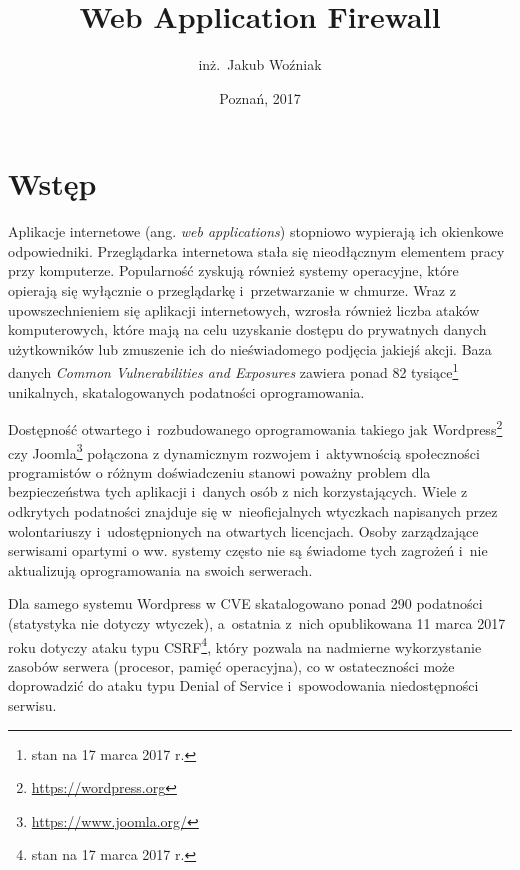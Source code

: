 \documentclass[11pt,a4paper,polish,thesis]{dcsbook}
\begin{document}
\author{inż.~Jakub Woźniak}
\title{Web Application Firewall}
\date{Poznań, 2017}
\maketitle
\frontmatter
\tableofcontents
\mainmatter


\chapter{Wstęp}

Aplikacje internetowe (ang. \textit{web applications}) stopniowo wypierają ich okienkowe odpowiedniki. Przeglądarka internetowa stała się nieodłącznym elementem pracy przy komputerze. Popularność zyskują również systemy operacyjne, które opierają się wyłącznie o przeglądarkę i~przetwarzanie w chmurze. Wraz z upowszechnieniem się aplikacji internetowych, wzrosła również liczba ataków komputerowych, które mają na celu uzyskanie dostępu do prywatnych danych użytkowników lub zmuszenie ich do nieświadomego podjęcia jakiejś akcji. Baza danych \textit{Common Vulnerabilities and Exposures}\cite{cve} zawiera ponad 82 tysiące\footnote{stan na 17 marca 2017 r.} unikalnych, skatalogowanych podatności oprogramowania.

Dostępność otwartego i~rozbudowanego oprogramowania takiego jak Wordpress\footnote{\url{https://wordpress.org}} czy Joomla\footnote{\url{https://www.joomla.org/}} połączona z dynamicznym rozwojem i~aktywnością społeczności programistów o różnym doświadczeniu stanowi poważny problem dla bezpieczeństwa tych aplikacji i~danych osób z nich korzystających. Wiele z odkrytych podatności znajduje się w~nieoficjalnych wtyczkach napisanych przez wolontariuszy i~udostępnionych na otwartych licencjach. Osoby zarządzające serwisami opartymi o ww. systemy często nie są świadome tych zagrożeń i~nie aktualizują oprogramowania na swoich serwerach. 

Dla samego systemu Wordpress w CVE skatalogowano ponad 290 podatności (statystyka nie dotyczy wtyczek), a~ostatnia z~nich opublikowana 11 marca 2017 roku dotyczy ataku typu CSRF\footnote{stan na 17 marca 2017 r.}, który pozwala na nadmierne wykorzystanie zasobów serwera (procesor, pamięć operacyjna), co w ostateczności może doprowadzić do ataku typu Denial of Service i~spowodowania niedostępności serwisu.
\end{document}
